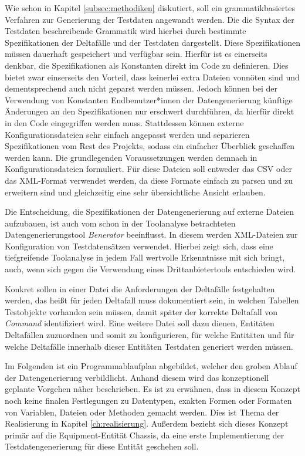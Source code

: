 Wie schon in Kapitel \ref{subsec:methodiken} diskutiert, soll ein grammatikbasiertes Verfahren zur Generierung der Testdaten angewandt werden. Die die Syntax der Testdaten beschreibende Grammatik wird hierbei durch bestimmte Spezifikationen der Deltafälle und der Testdaten dargestellt. Diese Spezifikationen müssen dauerhaft gespeichert und verfügbar sein. Hierfür ist es einerseits denkbar, die Spezifikationen als Konstanten direkt im Code zu definieren. Dies bietet zwar einserseits den Vorteil, dass keinerlei extra Dateien vonnöten sind und dementsprechend auch nicht geparst werden müssen. Jedoch können bei der Verwendung von Konstanten Endbenutzer*innen der Datengenerierung künftige Änderungen an den Spezifikationen nur erschwert durchführen, da hierfür direkt in den Code eingegriffen werden muss. Stattdessen können externe Konfigurationsdateien sehr einfach angepasst werden und separieren Spezifikationen vom Rest des Projekts, sodass ein einfacher Überblick geschaffen werden kann. Die grundlegenden Voraussetzungen werden demnach in Konfigurationsdateien formuliert. Für diese Dateien soll entweder das \ac{CSV} oder das \ac{XML}-Format verwendet werden, da diese Formate einfach zu parsen und zu erweitern sind und gleichzeitig eine sehr übersichtliche Ansicht erlauben.

Die Entscheidung, die Spezifikationen der Datengenerierung auf externe Dateien aufzubauen, ist auch vom schon in der Toolanalyse betrachteten Datengenerierungstool \textit{Benerator} beeinflusst. In diesem werden \ac{XML}-Dateien zur Konfiguration von Testdatensätzen verwendet. \cite{benerator:2022} Hierbei zeigt sich, dass eine tiefgreifende Toolanalyse in jedem Fall wertvolle Erkenntnisse mit sich bringt, auch, wenn sich gegen die Verwendung eines Drittanbietertools entschieden wird.

Konkret sollen in einer Datei die Anforderungen der Deltafälle festgehalten werden, das heißt für jeden Deltafall muss dokumentiert sein, in welchen Tabellen Testobjekte vorhanden sein müssen, damit später der korrekte Deltafall von \textit{Command} identifiziert wird. Eine weitere Datei soll dazu dienen, Entitäten Deltafällen zuzuordnen und somit zu konfigurieren, für welche Entitäten und für welche Deltafälle innerhalb dieser Entitäten Testdaten generiert werden müssen.

Im Folgenden ist ein Programmablaufplan abgebildet, welcher den groben Ablauf der Datengenerierung verbildlicht. Anhand diesem wird das konzeptionell geplante Vorgehen näher beschrieben. Es ist zu erwähnen, dass in diesem Konzept noch keine finalen Festlegungen zu Datentypen, exakten Formen oder Formaten von Variablen, Dateien oder Methoden gemacht werden. Dies ist Thema der Realisierung in Kapitel \ref{ch:realisierung}. Außerdem bezieht sich dieses Konzept primär auf die Equipment-Entität Chassis, da eine erste Implementierung der Testdatengenerierung für diese Entität geschehen soll.

